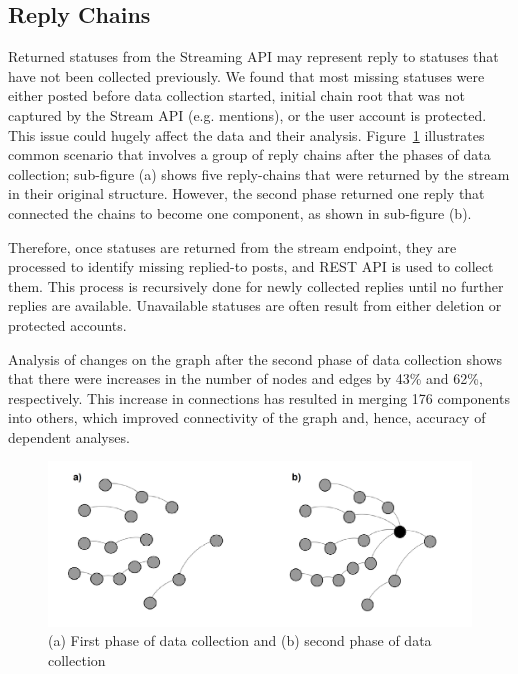 \documentclass[sigconf]{acmart}
\begin{document}
\subsection{Reply Chains}

Returned statuses from the Streaming API may represent reply to
statuses that have not been collected previously. We found that most
missing statuses were either posted before data collection started,
initial chain root that was not captured by the Stream API
(e.g. mentions), or the user account is protected. This issue could
hugely affect the data and their
analysis. Figure~\ref{fig:datacollectionphases} illustrates common
scenario that involves a group of reply chains after the phases of
data collection; sub-figure (a) shows five reply-chains that were
returned by the stream in their original structure. However, the
second phase returned one reply that connected the chains to become
one component, as shown in sub-figure (b).

Therefore, once statuses are returned from the stream endpoint, they
are processed to identify missing replied-to posts, and REST API is
used to collect them. This process is recursively done for newly
collected replies until no further replies are available. Unavailable
statuses are often result from either deletion or protected accounts.

Analysis of changes on the graph after the second phase of data
collection shows that there were increases in the number of nodes and
edges by 43\% and 62\%, respectively. This increase in connections has
resulted in merging 176 components into others, which improved
connectivity of the graph and, hence, accuracy of dependent analyses.

\begin{figure}[htb]
\centering
\includegraphics[width=\columnwidth]{images/datacollectionphases.png}
\caption{(a) First phase of data collection and (b) second phase of data
collection}
\label{fig:datacollectionphases}
\end{figure}
\end{document}
